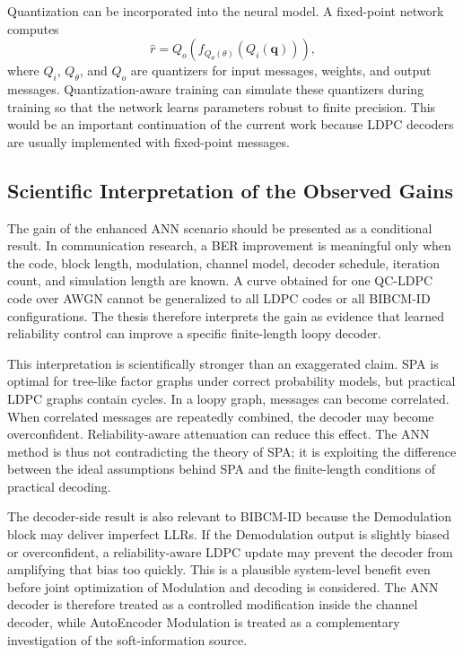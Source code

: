 Quantization can be incorporated into the neural model. A fixed-point network computes
\begin{equation}
  \hat{r}=Q_o\left(f_{Q_\theta(\theta)}(Q_i(\mathbf{q}))\right),
\end{equation}
where $Q_i$, $Q_\theta$, and $Q_o$ are quantizers for input messages, weights, and output messages. Quantization-aware training can simulate these quantizers during training so that the network learns parameters robust to finite precision. This would be an important continuation of the current work because LDPC decoders are usually implemented with fixed-point messages.

\subsection{Scientific Interpretation of the Observed Gains}
The gain of the enhanced ANN scenario should be presented as a conditional result. In communication research, a BER improvement is meaningful only when the code, block length, modulation, channel model, decoder schedule, iteration count, and simulation length are known. A curve obtained for one QC-LDPC code over AWGN cannot be generalized to all LDPC codes or all BIBCM-ID configurations. The thesis therefore interprets the gain as evidence that learned reliability control can improve a specific finite-length loopy decoder.

This interpretation is scientifically stronger than an exaggerated claim. SPA is optimal for tree-like factor graphs under correct probability models, but practical LDPC graphs contain cycles. In a loopy graph, messages can become correlated. When correlated messages are repeatedly combined, the decoder may become overconfident. Reliability-aware attenuation can reduce this effect. The ANN method is thus not contradicting the theory of SPA; it is exploiting the difference between the ideal assumptions behind SPA and the finite-length conditions of practical decoding.

The decoder-side result is also relevant to BIBCM-ID because the Demodulation block may deliver imperfect LLRs. If the Demodulation output is slightly biased or overconfident, a reliability-aware LDPC update may prevent the decoder from amplifying that bias too quickly. This is a plausible system-level benefit even before joint optimization of Modulation and decoding is considered. The ANN decoder is therefore treated as a controlled modification inside the channel decoder, while AutoEncoder Modulation is treated as a complementary investigation of the soft-information source.

